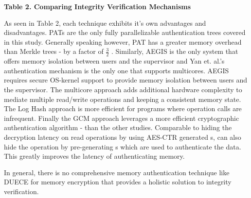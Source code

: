 \begin{center}

  \textbf{Table 2. Comparing Integrity Verification Mechanisms}

\end{center}

As seen in Table 2, each technique exhibits it's own advantages and
disadvantages. PATs are the only fully parallelizable authentication trees
covered in this study. Generally speaking however, PAT has a greater memory
overhead than Merkle trees - by a factor of $\frac{3}{2}$ \cite{surveyInt}.
Similarly, AEGIS is the only system that offers memory isolation between users
and the supervisor and Yan et. al.'s authentication mechanism is the only one
that supports multicores. AEGIS requires secure OS-kernel support to provide
memory isolation between users and the supervisor. The multicore approach
\cite{multicoreEnc} adds additional hardware complexity to mediate multiple
read/write operations and keeping a consistent memory state. The Log Hash
\cite{suh-memIntEnc} approach is more efficient for programs where
 operation calls are infrequent. Finally the GCM approach
\cite{gcmMem} leverages a more efficient cryptographic authentication algorithm
-  than the other studies. Comparable to hiding the decryption
latency on read operations by using AES-CTR generated s,
 can also hide the  operation by
pre-generating s which are used to authenticate the data. This greatly
improves the latency of authenticating memory.

In general, there is no comprehensive memory authentication technique like
DUECE for memory encryption that provides a holistic solution to integrity
verification.
